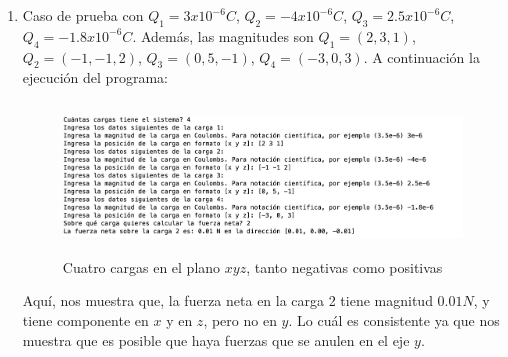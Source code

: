\documentclass[12pt, letterpaper]{report}
\begin{document}
\begin{enumerate}
\item Caso de prueba con $Q_1 = 3x10^{-6}C$, $Q_2 = -4x10^{-6}C$, $Q_3 = 2.5x10^{-6}C$, $Q_4 = -1.8x10^{-6}C$. Además, las magnitudes son $Q_1 = (2, 3, 1)$, $Q_2 = (-1, -1, 2)$, 
$Q_3 = (0, 5, -1)$, $Q_4 = (-3, 0, 3)$. A continuación la ejecución del programa: 
\begin{figure}[H]
    \centering
    \includegraphics[height = 4cm]{2024-04-11_Prueba3SimuladorCoulomb.png}
    \caption{Cuatro cargas en el plano $xyz$, tanto negativas como positivas}
\end{figure}
Aquí, nos muestra que, la fuerza neta en la carga 2 tiene magnitud $0.01N$, y tiene componente en $x$ y en $z$, pero no en $y$. Lo cuál es consistente ya que 
nos muestra que es posible que haya fuerzas que se anulen en el eje $y$.
\end{enumerate}
\end{document}
